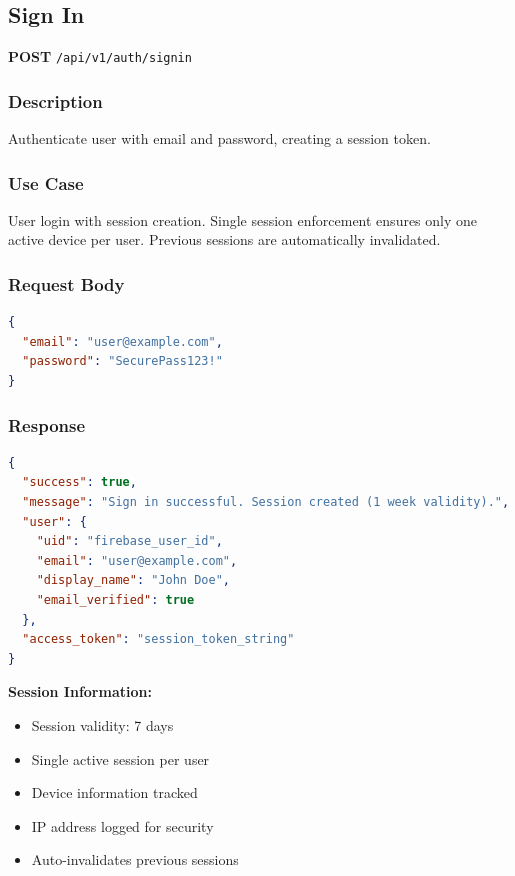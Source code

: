 \documentclass[11pt,a4paper]{report}
\begin{document}
\subsection{Sign In}

\textbf{POST} \texttt{/api/v1/auth/signin}

\subsubsection{Description}
Authenticate user with email and password, creating a session token.

\subsubsection{Use Case}
User login with session creation. Single session enforcement ensures only one active device per user. Previous sessions are automatically invalidated.

\subsubsection{Request Body}
\begin{lstlisting}[style=jsoncode,language=json]
{
  "email": "user@example.com",
  "password": "SecurePass123!"
}
\end{lstlisting}

\subsubsection{Response}
\begin{lstlisting}[style=jsoncode,language=json]
{
  "success": true,
  "message": "Sign in successful. Session created (1 week validity).",
  "user": {
    "uid": "firebase_user_id",
    "email": "user@example.com",
    "display_name": "John Doe",
    "email_verified": true
  },
  "access_token": "session_token_string"
}
\end{lstlisting}

\begin{infobox}
\textbf{Session Information:}
\begin{itemize}[leftmargin=*]
    \item Session validity: 7 days
    \item Single active session per user
    \item Device information tracked
    \item IP address logged for security
    \item Auto-invalidates previous sessions
\end{itemize}
\end{infobox}
\end{document}
